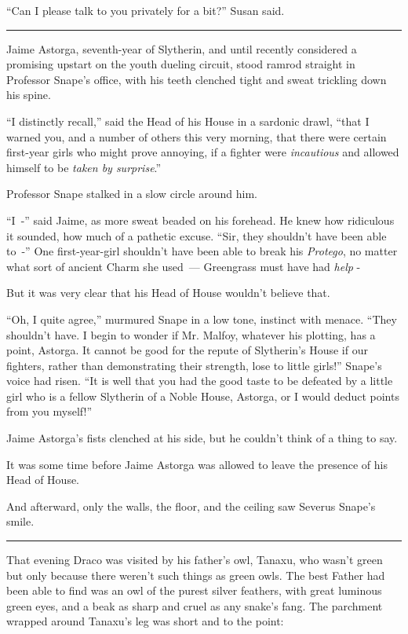 ``Can I please talk to you privately for a bit?'' Susan said.

\begin{center}\rule{3in}{0.4pt}\end{center}

Jaime Astorga, seventh-year of Slytherin, and until recently considered a promising upstart on the youth dueling circuit, stood ramrod straight in Professor Snape's office, with his teeth clenched tight and sweat trickling down his spine.

``I distinctly recall,'' said the Head of his House in a sardonic drawl, ``that I warned you, and a number of others this very morning, that there were certain first-year girls who might prove annoying, if a fighter were \emph{incautious} and allowed himself to be \emph{taken by surprise}.''

Professor Snape stalked in a slow circle around him.

``I~-'' said Jaime, as more sweat beaded on his forehead. He knew how ridiculous it sounded, how much of a pathetic excuse. ``Sir, they shouldn't have been able to~-'' One first-year-girl shouldn't have been able to break his \emph{Protego}, no matter what sort of ancient Charm she used~--- Greengrass must have had \emph{help} -

But it was very clear that his Head of House wouldn't believe that.

``Oh, I quite agree,'' murmured Snape in a low tone, instinct with menace. ``They shouldn't have. I begin to wonder if Mr. Malfoy, whatever his plotting, has a point, Astorga. It cannot be good for the repute of Slytherin's House if our fighters, rather than demonstrating their strength, lose to little girls!'' Snape's voice had risen. ``It is well that you had the good taste to be defeated by a little girl who is a fellow Slytherin of a Noble House, Astorga, or I would deduct points from you myself!''

Jaime Astorga's fists clenched at his side, but he couldn't think of a thing to say.

It was some time before Jaime Astorga was allowed to leave the presence of his Head of House.

And afterward, only the walls, the floor, and the ceiling saw Severus Snape's smile.

\begin{center}\rule{3in}{0.4pt}\end{center}

That evening Draco was visited by his father's owl, Tanaxu, who wasn't green but only because there weren't such things as green owls. The best Father had been able to find was an owl of the purest silver feathers, with great luminous green eyes, and a beak as sharp and cruel as any snake's fang. The parchment wrapped around Tanaxu's leg was short and to the point:

